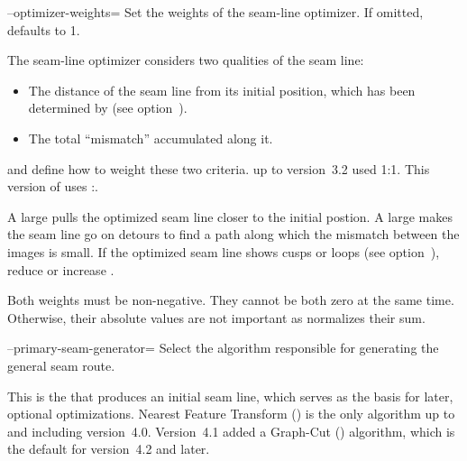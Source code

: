 \begin{codelist}
  \label{opt:optimizer-weights}%
\item[--optimizer-weights=\metavar{DISTANCE-WEIGHT}\optional{:\metavar{MISMATCH-WEIGHT}}]\itemend
  Set the weights of the seam-line optimizer.  If omitted,  defaults to
  1.

  The seam-line optimizer considers two qualities of the seam line:

  \begin{itemize}
  \item
    The distance of the seam line from its initial position, which has been determined by
     (see option~).

  \item
    The total ``mismatch'' accumulated along it.
  \end{itemize}

   and  define how to weight these two
  criteria.  \App{} up to version~3.2 used 1:1.  This version of \App{} uses
  :.

  A large  pulls the optimized seam line closer to the initial postion.
  A large  makes the seam line go on detours to find a path along
  which the mismatch between the images is small.  If the optimized seam line shows cusps or
  loops (see option~), reduce
   or increase .

  Both weights must be non-negative.  They cannot be both zero at the same time.  Otherwise,
  their absolute values are not important as \App{} normalizes their sum.


  \label{opt:primary-seam-generator}%
\item[--primary-seam-generator=\metavar{ALGORITHM}]\itemend
  Select the algorithm responsible for generating the general seam route.

  This is the  that produces an initial seam line, which serves as the basis
  for later, optional optimizations.  Nearest Feature Transform () is the only
  algorithm up to and including \App{} version~4.0.  Version~4.1 added a Graph-Cut
  () algorithm, which is the default for version~4.2 and later.


\end{codelist}

